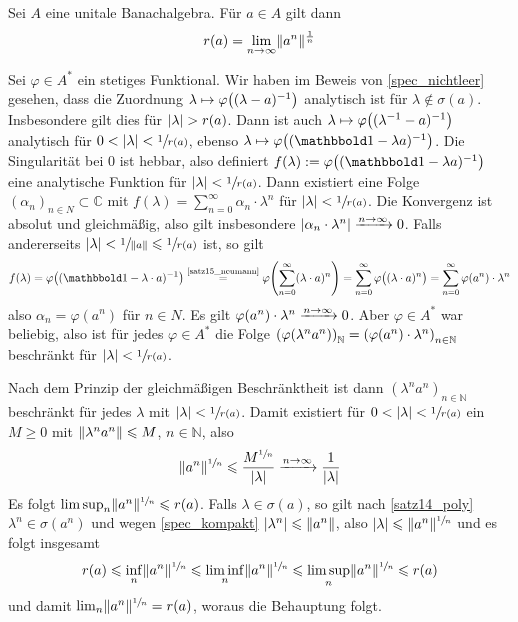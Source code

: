 \begin{satz}[{name=[Formel für den Spektralradius]},label=satz1.10]
	Sei $A$ eine unitale Banachalgebra. Für $a \in A$ gilt dann 
	\[
		r(a)=\lim_{n \to \infty}\norm{a^n}^{\frac{1}{n}}
	\]
\end{satz}
\begin{beweis}
	Sei $\varphi \in A^*$ ein stetiges Funktional. Wir haben im Beweis von \autoref{spec_nichtleer} gesehen, dass die Zuordnung 
	$\lambda \mapsto \varphi \enbrace*{(\lambda-a)^{-1}}$ analytisch ist für $\lambda \notin \sigma(a)$. Insbesondere gilt dies für $\abs{\lambda}> r(a)$. Dann ist auch
	$\lambda \mapsto \varphi \enbrace*{(\lambda^{-1}-a)^{-1}}$ analytisch für $0< \abs{\lambda}< \sfrac{1}{r(a)}$, ebenso 
	$\lambda \mapsto \varphi \enbrace*{(\ind- \lambda a)^{-1}}$. Die Singularität bei $0$ ist hebbar, also definiert $f(\lambda) := \varphi \enbrace*{(\ind-\lambda a)^{-1}}$
	eine analytische Funktion für $\abs{\lambda} < \sfrac{1}{r(a)}$. Dann existiert eine Folge $(\alpha_n)_{n \in N} \subset \mathbb{C}$ mit 
	$f(\lambda) = \sum_{n=0}^{\infty} \alpha_n \cdot \lambda^n$ für $\abs{\lambda}<\sfrac{1}{r(a)}$. Die Konvergenz ist absolut und gleichmäßig, also gilt insbesondere 
	$\abs{\alpha_n \cdot \lambda^n} \xrightarrow{\raisemath{-1pt}{n \to \infty}}0$. Falls andererseits $\abs{\lambda} < \sfrac{1}{\norm{a}} \le \sfrac{1}{r(a)}$ 
	ist, so gilt
	\[
		f(\lambda) = \varphi \enbrace*{(\ind- \lambda \cdot a)^{-1}} \StackText{\ref{satz15_neumann}}{=} \varphi \enbrace*{\sum_{n=0}^{\infty} (\lambda \cdot a)^n} = 
		\sum_{n=0}^{\infty} \varphi \enbrace[\big]{(\lambda \cdot a)^n} = \sum_{n=0}^{\infty} \varphi(a^n) \cdot \lambda^n
	\]
	also $\alpha_n =\varphi(a^n)$ für $n \in N$. Es gilt $\varphi(a^n) \cdot \lambda^n \xrightarrow{\raisemath{-1pt}{n \to\infty}} 0$. Aber $\varphi \in A^*$ war beliebig, 
	also ist für jedes $\varphi \in A^*$ die Folge $\enbrace*{\varphi(\lambda^n a^n)}_\mathbb{N} = \enbrace*{\varphi(a^n) \cdot \lambda^n}_{n \in \mathbb{N}}$ beschränkt für 
	$\abs{\lambda}<\sfrac{1}{r(a)}$.

	Nach dem Prinzip der gleichmäßigen Beschränktheit ist dann $(\lambda^n a^n)_{n \in \mathbb{N}}$ beschränkt für jedes $\lambda$ mit $\abs{\lambda}< \sfrac{1}{r(a)}$. Damit 
	existiert für $0 < \abs{\lambda}< \sfrac{1}{r(a)}$ ein $M \ge 0$ mit $\norm{\lambda^n a^n} \le M$, $n \in \mathbb{N}$, also 
	\[
		\norm{a^n}^{\sfrac{1}{n}}\le\frac{M^{\sfrac{1}{n}}}{\abs{\lambda}} \xrightarrow{n \to \infty} \frac{1}{\abs{\lambda}} 
	\]
	Es folgt $\limsup_n \norm{a^n}^{\sfrac{1}{n}} \le r(a)$. Falls $\lambda \in \sigma(a)$, so gilt nach \autoref{satz14_poly} $\lambda^n \in \sigma(a^n)$ und wegen 
	\autoref{spec_kompakt} $\abs{\lambda^n} \le \norm{a^n}$, also $\abs{\lambda} \le \norm{a^n}^{\sfrac{1}{n}}$ und es folgt insgesamt
	\begin{align}
		r(a) \le \inf_n \norm{a^n}^{\sfrac{1}{n}} \le \liminf_n \norm{a^n}^{\sfrac{1}{n}} \le \limsup_n \norm{a^n}^{\sfrac{1}{n}} \le r(a)
	\end{align}
	und damit $\lim_n \norm{a^n}^{\sfrac{1}{n}} = r(a)$, woraus die Behauptung folgt. 
\end{beweis}

